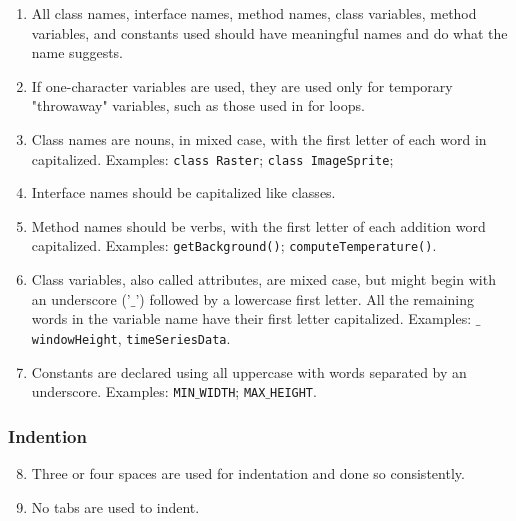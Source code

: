 \begin{enumerate}

\item All class names, interface names, method names, class variables, method variables, and constants used should have meaningful names and do what the name suggests.

\item If one-character variables are used, they are used only for temporary "throwaway" variables, such as those used in for loops.

\item Class names are nouns, in mixed case, with the first letter of each word in capitalized. Examples: \texttt{class Raster}; \texttt{class ImageSprite};

\item Interface names should be capitalized like classes.

\item Method names should be verbs, with the first letter of each addition word
capitalized. Examples: \texttt{getBackground()}; \texttt{computeTemperature()}.

\item Class variables, also called attributes, are mixed case, but might begin with an underscore ('$\_$') followed by a lowercase first letter. All the remaining words in the variable name have their first letter capitalized. Examples: \texttt{$\_$windowHeight}, \texttt{timeSeriesData}.

\item Constants are declared using all uppercase with words separated by an underscore. Examples: \texttt{MIN$\_$WIDTH}; \texttt{MAX$\_$HEIGHT}.

\end{enumerate}

\subsubsection{Indention} \label{sssec:indention}

\begin{enumerate}
\setcounter{enumi}{7}
  
\item Three or four spaces are used for indentation and done so consistently.
  
\item No tabs are used to indent.

\end{enumerate}


